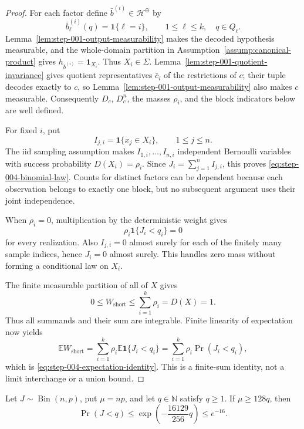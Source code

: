 \begin{proof}
For each factor define \(\bar b^{(i)}\in\mathcal H^\oplus\) by
\[
\bar b^{(i)}_\ell(q)=\mathbf 1\{\ell=i\},
\qquad 1\le \ell\le k,\quad q\in Q_\ell.
\]
Lemma~\ref{lem:step-001-output-measurability} makes the decoded hypothesis
measurable, and the whole-domain partition in
Assumption~\ref{assump:canonical-product} gives
\(h_{\bar b^{(i)}}=\mathbf 1_{X_i}\).  Thus \(X_i\in\Sigma\).
Lemma~\ref{lem:step-001-quotient-invariance} gives quotient
representatives \(\bar c_i\) of the restrictions of \(c\); their tuple
decodes exactly to \(c\), so
Lemma~\ref{lem:step-001-output-measurability} also makes \(c\) measurable.
Consequently \(D_c\), \(D_c^n\), the masses \(\rho_i\), and the block
indicators below are well defined.

For fixed \(i\), put
\[
I_{j,i}=\mathbf 1\{x_j\in X_i\},\qquad 1\le j\le n.
\]
The iid sampling assumption makes \(I_{1,i},\ldots,I_{n,i}\) independent
Bernoulli variables with success probability \(D(X_i)=\rho_i\).  Since
\(J_i=\sum_{j=1}^n I_{j,i}\), this proves
\eqref{eq:step-004-binomial-law}.  Counts for distinct factors can be
dependent because each observation belongs to exactly one block, but no
subsequent argument uses their joint independence.

When \(\rho_i=0\), multiplication by the deterministic weight gives
\[
\rho_i\mathbf 1\{J_i<q_i\}=0
\]
for every realization.  Also \(I_{j,i}=0\) almost surely for each of the
finitely many sample indices, hence \(J_i=0\) almost surely.  This handles
zero mass without forming a conditional law on \(X_i\).

The finite measurable partition of all of \(X\) gives
\[
0\le W_{\mathrm{short}}
\le\sum_{i=1}^k\rho_i=D(X)=1.
\]
Thus all summands and their sum are integrable.  Finite linearity of
expectation now yields
\[
\mathbb E W_{\mathrm{short}}
=\sum_{i=1}^k\rho_i\mathbb E\mathbf 1\{J_i<q_i\}
=\sum_{i=1}^k\rho_i\Pr(J_i<q_i),
\]
which is \eqref{eq:step-004-expectation-identity}.  This is a finite-sum
identity, not a limit interchange or a union bound.
\end{proof}

\begin{lemma}
\label{lem:step-004-heavy-shortage}
Let \(J\sim\operatorname{Bin}(n,p)\), put \(\mu=np\), and let
\(q\in\mathbb N\) satisfy \(q\ge1\).  If \(\mu\ge128q\), then
\begin{equation}\label{eq:step-004-heavy-tail}
\Pr(J<q)
\le \exp\!\left(-\frac{16129}{256}q\right)
\le e^{-16}.
\end{equation}
\end{lemma}

